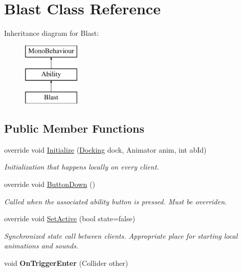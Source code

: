 \hypertarget{class_blast}{}\section{Blast Class Reference}
\label{class_blast}
Inheritance diagram for Blast\+:\begin{figure}[H]
\begin{center}
\leavevmode
\includegraphics[height=3.000000cm]{class_blast}
\end{center}
\end{figure}
\subsection*{Public Member Functions}
\begin{DoxyCompactItemize}
\item 
override void \hyperlink{class_blast_a1c0b1bd2d101c05fdbe09d32a5c5c44a}{Initialize} (\hyperlink{class_docking}{Docking} dock, Animator anim, int ab\+Id)
\begin{DoxyCompactList}\small\item\em Initialization that happens locally on every client. \end{DoxyCompactList}\item 
override void \hyperlink{class_blast_ab6e8d7899a858bc2da1978d40d266a63}{Button\+Down} ()
\begin{DoxyCompactList}\small\item\em Called when the associated ability button is pressed. Must be overriden. \end{DoxyCompactList}\item 
override void \hyperlink{class_blast_a65e2759005f4f28df38ab5a5287ff548}{Set\+Active} (bool state=false)
\begin{DoxyCompactList}\small\item\em Synchronized state call between clients. Appropriate place for starting local animations and sounds. \end{DoxyCompactList}\item 
\hypertarget{class_blast_a2c1f5c534fe75d73a8a33c4338fb1062}{}\label{class_blast_a2c1f5c534fe75d73a8a33c4338fb1062} 
void {\bfseries On\+Trigger\+Enter} (Collider other)
\end{DoxyCompactItemize}
